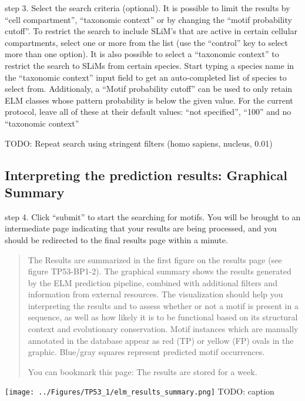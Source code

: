step 3. Select the search criteria (optional). It is possible to limit
the results by ``cell compartment'', ``taxonomic context'' or by
changing the ``motif probability cutoff''. To restrict the search to
include SLiM's that are active in certain cellular compartments, select
one or more from the list (use the ``control'' key to select more than
one option). It is also possible to select a ``taxonomic context'' to
restrict the search to SLiMs from certain species. Start typing a
species name in the ``taxonomic context'' input field to get an
auto-completed list of species to select from. Additionaly, a ``Motif
probability cutoff'' can be used to only retain ELM classes whose
pattern probability is below the given value. For the current protocol,
leave all of these at their default values: ``not specified'', ``100''
and no ``taxonomic context''

TODO: Repeat search using stringent filters (homo sapiens, nucleus,
0.01)

\subsection{Interpreting the prediction results: Graphical
Summary}\label{interpreting-the-prediction-results-graphical-summary}

step 4. Click ``submit'' to start the searching for motifs. You will be
brought to an intermediate page indicating that your results are being
processed, and you should be redirected to the final results page within
a minute.

\begin{quote}
The Results are summarized in the first figure on the results page (see
figure TP53-BP1-2). The graphical summary shows the results generated by
the ELM prediction pipeline, combined with additional filters and
information from external resources. The visualization should help you
interpreting the results and to assess whether or not a motif is present
in a sequence, as well as how likely it is to be functional based on its
structural context and evolutionary conservation. Motif instances which
are manually annotated in the database appear as red (TP) or yellow (FP)
ovals in the graphic. Blue/gray squares represent predicted motif
occurrences.

You can bookmark this page: The results are stored for a week.
\end{quote}

\texttt{[image: ../Figures/TP53\_1/elm\_results\_summary.png]} TODO:
caption

